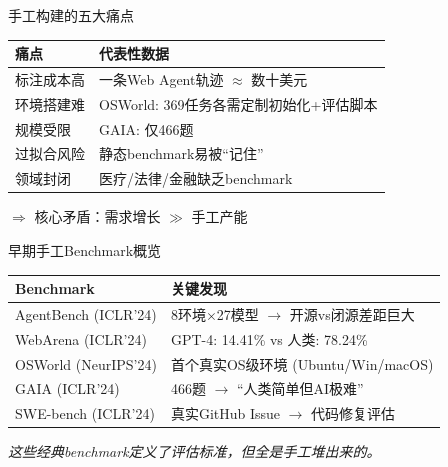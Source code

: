 \documentclass[aspectratio=169, 11pt]{beamer}
\begin{document}
\begin{frame}{手工构建的五大痛点}
\small
\begin{tabular}{@{}p{2.8cm}p{8.5cm}@{}}
\toprule
\textbf{痛点} & \textbf{代表性数据} \\
\midrule
标注成本高 & 一条Web Agent轨迹 $\approx$ 数十美元 \\[4pt]
环境搭建难 & OSWorld: 369任务各需定制初始化+评估脚本 \\[4pt]
规模受限 & GAIA: 仅466题 \\[4pt]
过拟合风险 & 静态benchmark易被``记住'' \\[4pt]
领域封闭 & 医疗/法律/金融缺乏benchmark \\
\bottomrule
\end{tabular}

\vspace{12pt}
\begin{center}
\alert{\large $\Longrightarrow$ 核心矛盾：需求增长 $\gg$ 手工产能}
\end{center}
\end{frame}

\begin{frame}{早期手工Benchmark概览}
\small
\begin{tabular}{@{}lp{7.5cm}@{}}
\toprule
\textbf{Benchmark} & \textbf{关键发现} \\
\midrule
AgentBench \scriptsize{(ICLR'24)} & 8环境$\times$27模型 $\rightarrow$ 开源vs闭源差距巨大 \\[4pt]
WebArena \scriptsize{(ICLR'24)} & GPT-4: 14.41\% \; vs \; 人类: 78.24\% \\[4pt]
OSWorld \scriptsize{(NeurIPS'24)} & 首个真实OS级环境 (Ubuntu/Win/macOS) \\[4pt]
GAIA \scriptsize{(ICLR'24)} & 466题 $\rightarrow$ ``人类简单但AI极难'' \\[4pt]
SWE-bench \scriptsize{(ICLR'24)} & 真实GitHub Issue $\rightarrow$ 代码修复评估 \\
\bottomrule
\end{tabular}

\vspace{10pt}
\begin{center}
\textit{这些经典benchmark定义了评估标准，但全是手工堆出来的。}
\end{center}
\end{frame}
\end{document}
